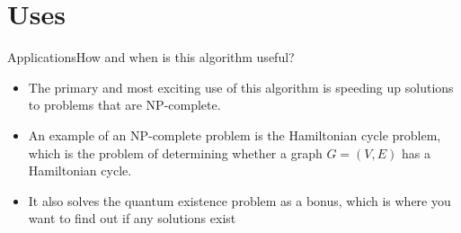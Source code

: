 \section*{Uses}

\begin{frame}{Applications}{How and when is this algorithm useful?}
\begin{itemize}
    \item The primary and most exciting use of this algorithm is speeding up solutions to problems that are NP-complete.
    \item An example of an NP-complete problem is the Hamiltonian cycle problem, which is the problem of determining whether a graph $G =(V,E)$ has a Hamiltonian cycle. 
    \item It also solves the quantum existence problem as a bonus, which is where you want to find out if any solutions exist

\end{itemize}
\end{frame}
